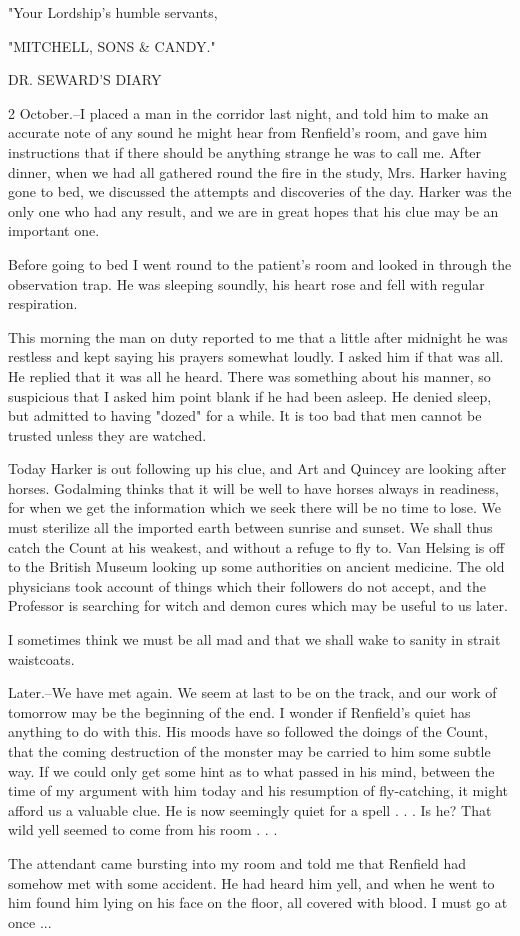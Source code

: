 "Your Lordship's humble servants, 

"MITCHELL, SONS \& CANDY." 

DR. SEWARD'S DIARY 

2 October.--I placed a man in the corridor last night, and told him to make an accurate note of any sound he might hear from Renfield's room, and gave him instructions that if there should be anything strange he was to call me. After dinner, when we had all gathered round the fire in the study, Mrs. Harker having gone to bed, we discussed the attempts and discoveries of the day. Harker was the only one who had any result, and we are in great hopes that his clue may be an important one. 

Before going to bed I went round to the patient's room and looked in through the observation trap. He was sleeping soundly, his heart rose and fell with regular respiration. 

This morning the man on duty reported to me that a little after midnight he was restless and kept saying his prayers somewhat loudly. I asked him if that was all. He replied that it was all he heard. There was something about his manner, so suspicious that I asked him point blank if he had been asleep. He denied sleep, but admitted to having "dozed" for a while. It is too bad that men cannot be trusted unless they are watched. 

Today Harker is out following up his clue, and Art and Quincey are looking after horses. Godalming thinks that it will be well to have horses always in readiness, for when we get the information which we seek there will be no time to lose. We must sterilize all the imported earth between sunrise and sunset. We shall thus catch the Count at his weakest, and without a refuge to fly to. Van Helsing is off to the British Museum looking up some authorities on ancient medicine. The old physicians took account of things which their followers do not accept, and the Professor is searching for witch and demon cures which may be useful to us later. 

I sometimes think we must be all mad and that we shall wake to sanity in strait waistcoats. 

Later.--We have met again. We seem at last to be on the track, and our work of tomorrow may be the beginning of the end. I wonder if Renfield's quiet has anything to do with this. His moods have so followed the doings of the Count, that the coming destruction of the monster may be carried to him some subtle way. If we could only get some hint as to what passed in his mind, between the time of my argument with him today and his resumption of fly-catching, it might afford us a valuable clue. He is now seemingly quiet for a spell . . . Is he? That wild yell seemed to come from his room . . . 

The attendant came bursting into my room and told me that Renfield had somehow met with some accident. He had heard him yell, and when he went to him found him lying on his face on the floor, all covered with blood. I must go at once ... 
